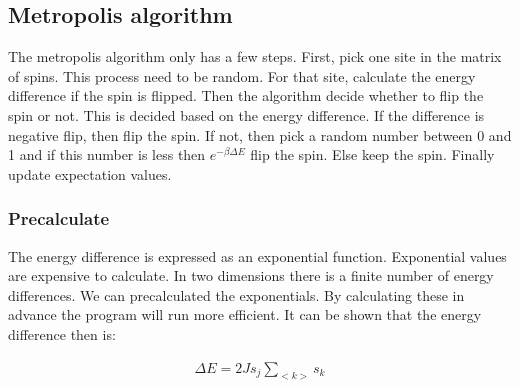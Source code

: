 
\subsection{Metropolis algorithm}\label{sec:metro}

The metropolis algorithm only has a few steps. First, pick one site in the matrix of spins. This process need to be random. For that site, calculate the energy difference if the spin is flipped. Then the algorithm decide whether to flip the spin or not. This is decided based on the energy difference. If the difference is negative flip, then flip the spin. If not, then pick a random number between 0 and 1 and if this number is less then $e^{-\beta \Delta E}$ flip the spin. Else keep the spin. Finally update expectation values.


\subsubsection{Precalculate}

The energy difference is expressed as an exponential function. Exponential values are expensive to calculate. In two dimensions there is a finite number of energy differences. We can precalculated the exponentials. By calculating these in advance the program will run more efficient. It can be shown that the energy difference then is\cite{compphys}:

\begin{align*}
	\Delta E = 2J s_j \sum_{<k>} s_k
\end{align*}



